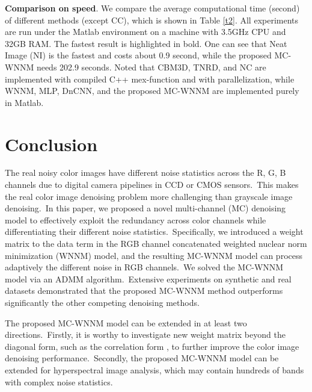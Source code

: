 \documentclass[10pt,twocolumn,letterpaper]{article}
\renewcommand{\huge}{\fontsize{8.3pt}{\baselineskip}\selectfont}
\begin{document}
\textbf{Comparison on speed}. We compare the average computational time (second) of different methods (except CC), which is shown in Table \ref{t2}. All experiments are run under the Matlab environment on a machine with 3.5GHz CPU and 32GB RAM. The fastest result is highlighted in bold. One can see that Neat Image (NI) is the fastest and costs about 0.9 second, while the proposed MC-WNNM needs 202.9 seconds. Noted that CBM3D, TNRD, and NC are implemented with compiled C++ mex-function and with parallelization, while WNNM, MLP, DnCNN, and the proposed MC-WNNM are implemented purely in Matlab.


\vspace{0mm}
\section{Conclusion}
\vspace{-0mm}

The real noisy color images have different noise statistics across the R, G, B channels due to digital camera pipelines in CCD or CMOS sensors.\ This makes the real color image denoising problem more challenging than grayscale image denoising.\ In this paper, we proposed a novel multi-channel (MC) denoising model to effectively exploit the redundancy across color channels while differentiating their different noise statistics.\ Specifically, we introduced a weight matrix to the data term in the RGB channel concatenated weighted nuclear norm minimization (WNNM) model, and the resulting MC-WNNM model can process adaptively the different noise in RGB channels.\ We solved the MC-WNNM model via an ADMM algorithm.\ Extensive experiments on synthetic and real datasets demonstrated that the proposed MC-WNNM method outperforms significantly the other competing denoising methods.

The proposed MC-WNNM model can be extended in at least two directions.\ Firstly, it is worthy to investigate new weight matrix beyond the diagonal form, such as the correlation form \cite{nearcor}, to further improve the color image denoising performance.\ Secondly, the proposed MC-WNNM model can be extended for hyperspectral image analysis, which may contain hundreds of bands with complex noise statistics.

{
\huge


}
\end{document}
